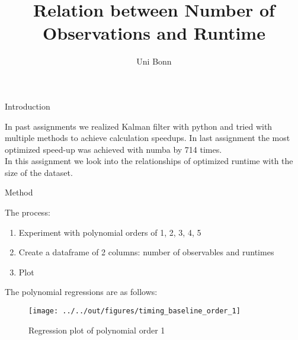 \documentclass[11pt]{beamer}
\begin{document}
\title{Relation between Number of Observations and Runtime}

\author[Group 7: Wenxin Hu, Ruizhuo Wan, Yan Zhang, Xiaoran Wu, Tianfan Sun]
{
{\small Uni Bonn}\\[1ex]
}


\begin{frame}
    \titlepage
    \note{~}
\end{frame}


\begin{frame}
        Introduction
\end{frame}


\begin{frame}
        In past assignments we realized Kalman filter with python and tried with multiple
        methods to achieve calculation speedups. In last assignment the most optimized speed-up was achieved with numba by 714 times. \\

        In this assignment we look into the relationships of optimized runtime with the size of the dataset.
\end{frame}


\begin{frame}
        Method
\end{frame}


\begin{frame}
        The process:
        \begin{enumerate}
                \item Experiment with polynomial orders of 1, 2, 3, 4, 5
                \item Create a dataframe of 2 columns: number of observables and runtimes
                \item Plot
        \end{enumerate}
\end{frame}


\begin{frame}
        The polynomial regressions are as follows:\\
        
\end{frame}


\begin{frame}
        \begin{figure}
    \caption{Regression plot of polynomial order 1}
    \texttt{[image: ../../out/figures/timing\_baseline\_order\_1]}
        \end{figure}
\end{frame}
\end{document}
